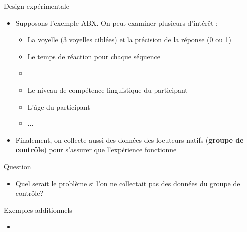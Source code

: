 \documentclass[xcolor=dvipsnames, mathserif, 10pt, aspectratio=169, handout]{beamer}
\begin{document}
\begin{frame}[t]{Design expérimentale}

\begin{itemize}
	\item Supposons l'exemple ABX. On peut examiner plusieurs  d'intérêt :

	\begin{itemize}
\pause
		\item La voyelle (3 voyelles ciblées) et la précision de la réponse (0 ou 1)
\pause
		\item Le temps de réaction pour chaque séquence
		\item[]
\pause
		\item Le niveau de compétence linguistique du participant
\pause
		\item L'âge du participant
		\item ...
	\end{itemize}

\pause
	
	\item Finalement, on collecte aussi des données des locuteurs natifs (\textbf{groupe de contrôle}) pour s'assurer que l'expérience fonctionne
\end{itemize}

\begin{center}
	\begin{importanttitle}{Question}
	
	\begin{itemize}
	\item[\winner] Quel serait le problème si l’on ne collectait pas des données du groupe de contrôle?
	\end{itemize}
	
		
	\end{importanttitle}
\end{center}
	
\end{frame}


\begin{frame}{Exemples additionnels}{}

\begin{itemize}
	\item[] 

\end{itemize}

\begin{center}
	\vfill
	\vfill
\end{center}
	
\end{frame}
\end{document}
